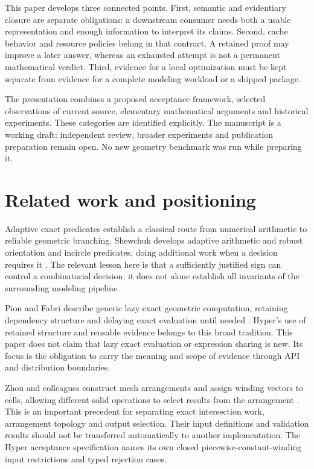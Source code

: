 \documentclass[11pt]{article}
\begin{document}
This paper develops three connected points. First, semantic and evidentiary
closure are separate obligations: a downstream consumer needs both a usable
representation and enough information to interpret its claims. Second, cache
behavior and resource policies belong in that contract. A retained proof may
improve a later answer, whereas an exhausted attempt is not a permanent
mathematical verdict. Third, evidence for a local optimization must be kept
separate from evidence for a complete modeling workload or a shipped package.

The presentation combines a proposed acceptance framework, selected observations
of current source, elementary mathematical arguments and historical experiments.
These categories are identified explicitly. The manuscript is a working draft:
independent review, broader experiments and publication preparation remain open.
No new geometry benchmark was run while preparing it.

\section{Related work and positioning}
Adaptive exact predicates establish a classical route from numerical arithmetic
to reliable geometric branching. Shewchuk develops adaptive arithmetic and
robust orientation and incircle predicates, doing additional work when a
decision requires it \cite{shewchuk}. The relevant lesson here is that a
sufficiently justified sign can control a combinatorial decision; it does not
alone establish all invariants of the surrounding modeling pipeline.

Pion and Fabri describe generic lazy exact geometric computation, retaining
dependency structure and delaying exact evaluation until needed
\cite{pionfabri}. Hyper's use of retained structure and reusable evidence
belongs to this broad tradition. This paper does not claim that lazy exact
evaluation or expression sharing is new. Its focus is the obligation to carry
the meaning and scope of evidence through API and distribution boundaries.

Zhou and colleagues construct mesh arrangements and assign winding vectors to
cells, allowing different solid operations to select results from the
arrangement \cite{zhou}. This is an important precedent for separating exact
intersection work, arrangement topology and output selection. Their input
definitions and validation results should not be transferred automatically to
another implementation. The Hyper acceptance specification names its own closed
piecewise-constant-winding input restrictions and typed rejection cases.
\end{document}

